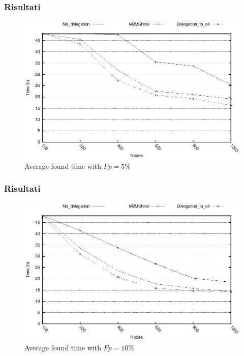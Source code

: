 \documentclass{beamer}
\begin{document}
\begin{frame}
\frametitle{Risultati}
\begin{center}
\begin{figure}[ht]
\includegraphics[scale=0.7]{../grafici/tempiVF_Fp5.eps}
\caption{Average found time with $Fp = 5\%$}
\end{figure}
\end{center}
\end{frame}

\begin{frame}
\frametitle{Risultati}
\begin{center}
\begin{figure}[ht]
\includegraphics[scale=0.7]{../grafici/tempiVF_Fp10.eps}
\caption{Average found time with $Fp = 10\%$}
\end{figure}
\end{center}
\end{frame}
\end{document}

